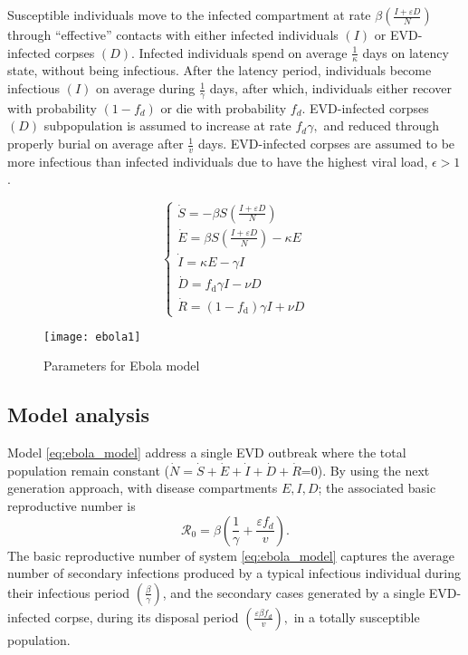 \documentclass{book}\usepackage[]{graphicx}\usepackage[]{color}
\begin{document}
Susceptible individuals move to the infected compartment at rate $\beta\left(\frac{I+\varepsilon D}{N}\right)$ through ``effective'' contacts with either infected individuals $(I)$ or EVD-infected corpses $(D)$. Infected individuals spend on average $\frac{1}{\kappa}$ days on latency state, without being infectious. After the latency period, individuals become infectious $(I)$
on average during $\frac{1}{\gamma}$ days, after which, individuals either recover with probability $\left(1-f_{d}\right)$ or die with probability $f_{d}$. EVD-infected corpses $(D)$ subpopulation is assumed to increase at rate $f_{d} \gamma,$ and reduced through properly burial on average after $\frac{1}{v}$ days. EVD-infected corpses are assumed to be more infectious than infected individuals due to have the highest viral load, $\epsilon>1$.

\begin{equation} \label{eq:ebola_model}
\left\{\begin{array}{l}
\dot{S}=-\beta S\left(\frac{I+\varepsilon D}{N}\right) \\
\dot{E}=\beta S\left(\frac{I+\varepsilon D}{N}\right)-\kappa E \\
\dot{I}=\kappa E-\gamma I \\
\dot{D}=f_{\mathrm{d}} \gamma I-\nu D \\
\dot{R}=\left(1-f_{\mathrm{d}}\right) \gamma I+\nu D
\end{array}\right.
\end{equation}

%
\begin{figure}[H]
    \centering
    \texttt{[image: ebola1]}
    \caption{Parameters for Ebola model}
    \label{fig:ebola_params}
\end{figure}

\subsection*{Model analysis}
Model \eqref{eq:ebola_model} address a single EVD outbreak where the total population remain constant ($\dot{N}=\dot{S}+\dot{E}+\dot{I}+\dot{D}+\dot{R}$=0).
By using the next generation approach, with disease compartments $E, I, D$; the associated
basic reproductive number is
\begin{equation} \label{eq:brn_ebola}
\mathscr{R}_{0}=\beta\left(\frac{1}{\gamma}+\frac{\varepsilon f_{d}}{v}\right).
\end{equation}
The basic reproductive number of system \eqref{eq:ebola_model} captures the average number of secondary
infections produced by a typical infectious individual during their infectious period $\left(\frac{\beta}{\gamma}\right)$,
and the secondary cases generated by a single EVD-infected corpse, during its disposal
period $\left(\frac{\varepsilon \beta f_{d}}{v}\right),$ in a totally susceptible population.
\end{document}
